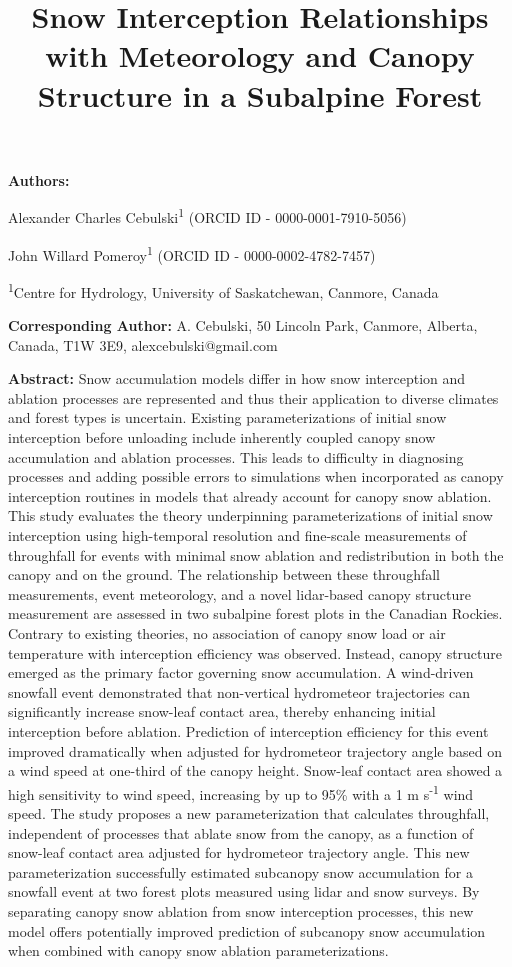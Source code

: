 \documentclass[
  letterpaper,
  DIV=11,
  numbers=noendperiod]{scrartcl}
\title{Snow Interception Relationships with Meteorology and Canopy
Structure in a Subalpine Forest}
\author{}
\date{}
\begin{document}
\maketitle



\textbf{Authors:}

Alexander Charles Cebulski\textsuperscript{1} (ORCID ID -
0000-0001-7910-5056)

John Willard Pomeroy\textsuperscript{1} (ORCID ID - 0000-0002-4782-7457)

\textsuperscript{1}Centre for Hydrology, University of Saskatchewan,
Canmore, Canada

\textbf{Corresponding Author:} A. Cebulski, 50 Lincoln Park, Canmore,
Alberta, Canada, T1W 3E9, alexcebulski@gmail.com

\textbf{Abstract:} Snow accumulation models differ in how snow
interception and ablation processes are represented and thus their
application to diverse climates and forest types is uncertain. Existing
parameterizations of initial snow interception before unloading include
inherently coupled canopy snow accumulation and ablation processes. This
leads to difficulty in diagnosing processes and adding possible errors
to simulations when incorporated as canopy interception routines in
models that already account for canopy snow ablation. This study
evaluates the theory underpinning parameterizations of initial snow
interception using high-temporal resolution and fine-scale measurements
of throughfall for events with minimal snow ablation and redistribution
in both the canopy and on the ground. The relationship between these
throughfall measurements, event meteorology, and a novel lidar-based
canopy structure measurement are assessed in two subalpine forest plots
in the Canadian Rockies. Contrary to existing theories, no association
of canopy snow load or air temperature with interception efficiency was
observed. Instead, canopy structure emerged as the primary factor
governing snow accumulation. A wind-driven snowfall event demonstrated
that non-vertical hydrometeor trajectories can significantly increase
snow-leaf contact area, thereby enhancing initial interception before
ablation. Prediction of interception efficiency for this event improved
dramatically when adjusted for hydrometeor trajectory angle based on a
wind speed at one-third of the canopy height. Snow-leaf contact area
showed a high sensitivity to wind speed, increasing by up to 95\% with a
1 m s\textsuperscript{-1} wind speed. The study proposes a new
parameterization that calculates throughfall, independent of processes
that ablate snow from the canopy, as a function of snow-leaf contact
area adjusted for hydrometeor trajectory angle. This new
parameterization successfully estimated subcanopy snow accumulation for
a snowfall event at two forest plots measured using lidar and snow
surveys. By separating canopy snow ablation from snow interception
processes, this new model offers potentially improved prediction of
subcanopy snow accumulation when combined with canopy snow ablation
parameterizations.
\end{document}
